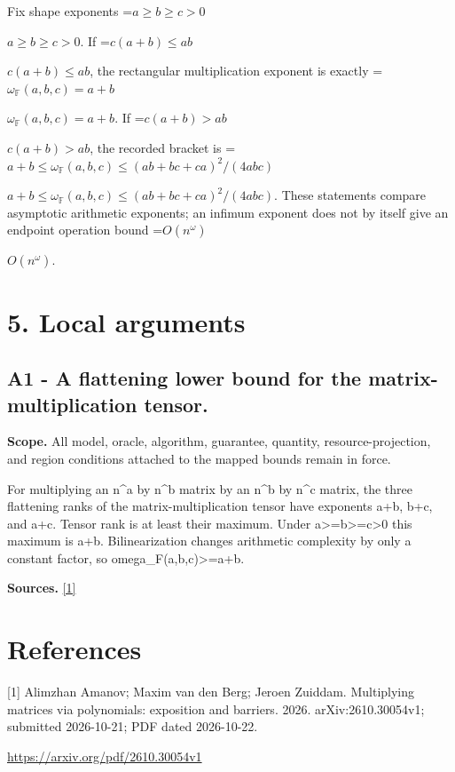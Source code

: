 \documentclass[10pt,a4paper]{article}
\newcommand{\AtlasMath}[1]{\par\begingroup\centering\setbox0=\hbox{$\displaystyle #1$}\ifdim\wd0>1.4\linewidth\typeout{ATLAS WIDE FORMULA: \the\wd0}\fi\ifdim\wd0>\linewidth\resizebox{\linewidth}{!}{\box0}\else\box0\fi\par\endgroup}
\newcommand{\AtlasInlineMath}[1]{\begingroup\setbox0=\hbox{$#1$}\ifdim\wd0>.4\linewidth\endgroup\AtlasMath{#1}\else\endgroup$#1$\fi}
\begin{document}
Fix shape exponents \AtlasInlineMath{a\ge b\ge c>0}. If \AtlasInlineMath{c(a+b)\le ab}, the rectangular multiplication exponent is exactly \AtlasInlineMath{\omega_{\mathbb F}(a,b,c)=a+b}. If \AtlasInlineMath{c(a+b)>ab}, the recorded bracket is \AtlasInlineMath{a+b\le\omega_{\mathbb F}(a,b,c)\le(ab+bc+ca)^2/(4abc)}. These statements compare asymptotic arithmetic exponents; an infimum exponent does not by itself give an endpoint operation bound \AtlasInlineMath{O(n^\omega)}.

\section{5. Local arguments}
\subsection{A1 - A flattening lower bound for the matrix-multiplication tensor.}
\textbf{Scope.} All model, oracle, algorithm, guarantee, quantity, resource-projection, and region conditions attached to the mapped bounds remain in force.

For multiplying an n\textasciicircum{}a by n\textasciicircum{}b matrix by an n\textasciicircum{}b by n\textasciicircum{}c matrix, the three flattening ranks of the matrix-multiplication tensor have exponents a+b, b+c, and a+c. Tensor rank is at least their maximum. Under a>=b>=c>0 this maximum is a+b. Bilinearization changes arithmetic complexity by only a constant factor, so omega\_F(a,b,c)>=a+b.

\textbf{Sources.} \href{https://arxiv.org/pdf/2610.30054v1}{[1]}

\section{References}
[1] Alimzhan Amanov; Maxim van den Berg; Jeroen Zuiddam. Multiplying matrices via polynomials: exposition and barriers. 2026. arXiv:2610.30054v1; submitted 2026-10-21; PDF dated 2026-10-22.

\url{https://arxiv.org/pdf/2610.30054v1}
\end{document}
